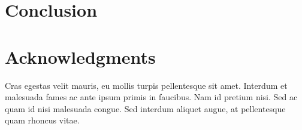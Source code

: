 \documentclass[10pt,letterpaper]{article}
\begin{document}
\section*{Conclusion}




\section*{Acknowledgments}
Cras egestas velit mauris, eu mollis turpis pellentesque sit amet. Interdum et malesuada fames ac ante ipsum primis in faucibus. Nam id pretium nisi. Sed ac quam id nisi malesuada congue. Sed interdum aliquet augue, at pellentesque quam rhoncus vitae.

\nolinenumbers




%
%
% 




\end{document}

